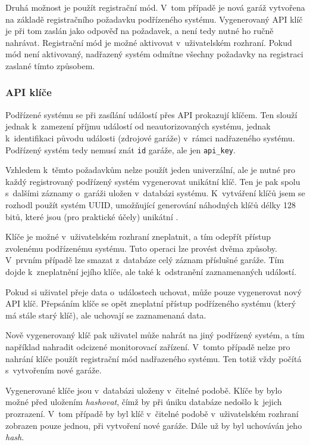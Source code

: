 Druhá možnost je použít registrační mód. V~tom případě je nová garáž vytvořena na základě registračního požadavku podřízeného systému. Vygenerovaný API klíč je při tom zaslán jako odpověď na požadavek, a není tedy nutné ho ručně nahrávat. Registrační mód je možné aktivovat v~uživatelském rozhraní. Pokud mód není aktivovaný, nadřazený systém odmítne všechny požadavky na registraci zaslané tímto způsobem.

\subsubsection{API klíče}
\label{sec:de_apikeys}

Podřízené systému se při zasílání událostí přes API prokazují klíčem. Ten slouží jednak k~zamezení příjmu událostí od neautorizovaných systému, jednak k~identifikaci původu události (zdrojové garáže) v~rámci nadřazeného systému. Podřízený systém tedy nemusí znát \texttt{id} garáže, ale jen \texttt{api\_key}.

Vzhledem k~těmto požadavkům nelze použít jeden univerzální, ale je nutné pro každý registrovaný podřízený systém vygenerovat unikátní klíč. Ten je pak spolu s~dalšími záznamy o~garáži uložen v~databázi systému. K~vytváření klíčů jsem se rozhodl použít systém UUID, umožňující generování náhodných klíčů délky 128 bitů, které jsou (pro praktické účely) unikátní \cite{rfc4122}.

Klíče je možné v~uživatelském rozhraní zneplatnit, a tím odepřít přístup zvolenému podřízenému systému. Tuto operaci lze provést dvěma způsoby. V~prvním případě lze smazat z~databáze celý záznam příslušné garáže. Tím dojde k~zneplatnění jejího klíče, ale také k~odstranění zaznamenaných událostí.

Pokud si uživatel přeje data o~událostech uchovat, může pouze vygenerovat nový API klíč. Přepsáním klíče se opět zneplatní přístup podřízeného systému (který má stále starý klíč), ale uchovají se zaznamenaná data. 

Nově vygenerovaný klíč pak uživatel může nahrát na jiný podřízený systém, a tím například nahradit odcizené monitorovací zařízení. V~tomto případě nelze pro nahrání klíče použít registrační mód nadřazeného systému. Ten totiž vždy počítá s~vytvořením nové garáže.

Vygenerované klíče jsou v~databázi uloženy v~čitelné podobě. Klíče by bylo možné před uložením \textit{hashovat}, čímž by při úniku databáze nedošlo k~jejich prozrazení. V~tom případě by byl klíč v~čitelné podobě v~uživatelském rozhraní zobrazen pouze jednou, při vytvoření nové garáže. Dále už by byl uchováván jeho \textit{hash}.

